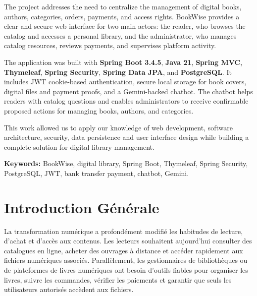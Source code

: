 \documentclass[12pt,a4paper]{report}
\renewcommand{\baselinestretch}{1.15}
\begin{document}
The project addresses the need to centralize the management of digital books, authors, categories, orders, payments, and access rights. BookWise provides a clear and secure web interface for two main actors: the reader, who browses the catalog and accesses a personal library, and the administrator, who manages catalog resources, reviews payments, and supervises platform activity.

The application was built with \textbf{Spring Boot 3.4.5}, \textbf{Java 21}, \textbf{Spring MVC}, \textbf{Thymeleaf}, \textbf{Spring Security}, \textbf{Spring Data JPA}, and \textbf{PostgreSQL}. It includes JWT cookie-based authentication, secure local storage for book covers, digital files and payment proofs, and a Gemini-backed chatbot. The chatbot helps readers with catalog questions and enables administrators to receive confirmable proposed actions for managing books, authors, and categories.

This work allowed us to apply our knowledge of web development, software architecture, security, data persistence and user interface design while building a complete solution for digital library management.

\textbf{Keywords:} BookWise, digital library, Spring Boot, Thymeleaf, Spring Security, PostgreSQL, JWT, bank transfer payment, chatbot, Gemini.

\begingroup
\footnotesize
\setlength{\parskip}{0pt}
\renewcommand{\baselinestretch}{0.95}\selectfont
\tableofcontents
\endgroup
\clearpage
\begingroup
\footnotesize
\setlength{\parskip}{0pt}
\renewcommand{\baselinestretch}{0.95}\selectfont
\listoffigures
\endgroup
\clearpage
\begingroup
\footnotesize
\setlength{\parskip}{0pt}
\renewcommand{\baselinestretch}{0.95}\selectfont
\listoftables
\endgroup
\clearpage

\chapter*{Introduction Générale}

La transformation numérique a profondément modifié les habitudes de lecture, d'achat et d'accès aux contenus. Les lecteurs souhaitent aujourd'hui consulter des catalogues en ligne, acheter des ouvrages à distance et accéder rapidement aux fichiers numériques associés. Parallèlement, les gestionnaires de bibliothèques ou de plateformes de livres numériques ont besoin d'outils fiables pour organiser les livres, suivre les commandes, vérifier les paiements et garantir que seuls les utilisateurs autorisés accèdent aux fichiers.
\end{document}
